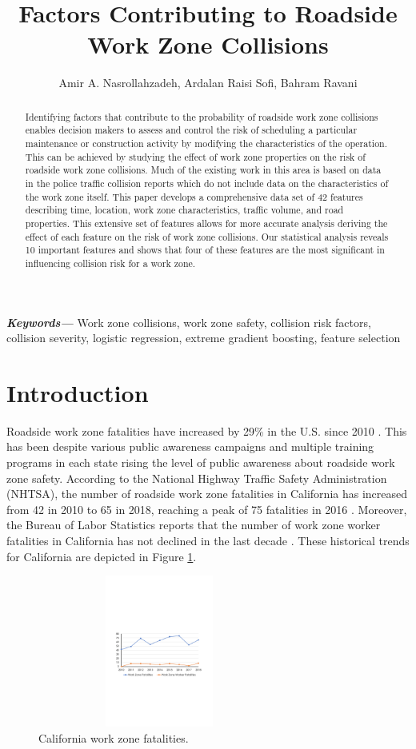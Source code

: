 \documentclass[10pt,a4paper]{article}
\author{Amir A. Nasrollahzadeh, Ardalan Raisi Sofi, Bahram Ravani}
\title{Factors Contributing to Roadside Work Zone Collisions}
\providecommand{\keywords}[1]
{
  \small	
  \textbf{\textit{Keywords---}} #1
}
\begin{document}
\maketitle
\begin{abstract}\label{se:abs}
Identifying factors that contribute to the probability of roadside work zone collisions enables decision makers to assess and control the risk of scheduling a particular maintenance or construction activity by modifying the characteristics of the operation. This can be achieved by studying the effect of work zone properties on the risk  of roadside work zone collisions. Much of the existing work in this area is based on data in the police traffic collision reports which do not include data on the characteristics of the work zone itself. This paper develops a comprehensive data set of 42 features describing time, location, work zone characteristics, traffic volume, and road properties. This extensive set of features allows for more accurate analysis deriving the effect of each feature on the risk  of work zone collisions. Our statistical analysis reveals 10 important features and shows that four of these features are the most significant in influencing collision risk for a work zone. 
\end{abstract}

\keywords{Work zone collisions, work zone safety, collision risk factors, collision severity, logistic regression, extreme gradient boosting, feature selection}

\section{Introduction}\label{se:intro}
Roadside work zone fatalities have increased by 29\% in the U.S. since 2010 \citep{injuryfacts2020}. This has been despite various public awareness campaigns and multiple training programs in each state rising the level of public awareness about roadside work zone safety. According to the National Highway Traffic Safety Administration (NHTSA), the number of roadside work zone fatalities in California has increased from 42 in 2010 to 65 in 2018, reaching a peak of 75 fatalities in 2016 \citep{caworkfatalities2018}. Moreover, the Bureau of Labor Statistics reports that the number of work zone worker fatalities in California has not declined in the last decade \citep{caworkerfatalities2018}. These historical trends for California are depicted in Figure \ref{fig:fatalities}.

\begin{figure}[hb!]
	\centering
	\includegraphics[width=8cm,height=5cm, trim=2cm 10cm 2cm 11cm, clip=true]{WZ fatalities}
	\caption{California work zone fatalities.}
	\label{fig:fatalities}
\end{figure}
\end{document}
